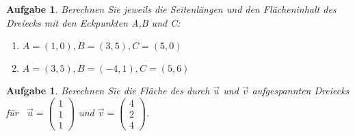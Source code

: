 \documentclass[12pt]{article}
\newtheorem{exercise}[satz]{Aufgabe}
\begin{document}
\vspace{0.1cm} 
   

\begin{exercise}
  Berechnen Sie jeweils die Seitenl\"angen und den Fl\"acheninhalt des Dreiecks mit den Eckpunkten A,B und C:
    \begin{enumerate}
    \item[(a)] $A=(1,0),B=(3,5),C=(5,0)$
    \item[(b)] $A=(3,5),B=(-4,1),C=(5,6)$
    \end{enumerate}
\end{exercise}

\vspace{0.1cm} 

\begin{exercise}
  Berechnen Sie die Fl\"ache des durch $\vec{u}$ und $\vec{v}$ aufgespannten Dreiecks f\"ur \,
  $\vec{u}=\left(\begin{array}{r} 1 \\ 1 \\ 1 \end{array}\right)$ und
  $\vec{v}=\left(\begin{array}{r} 4 \\ 2 \\ 4 \end{array}\right)$.
\end{exercise}
   
 
   
\end{document}
